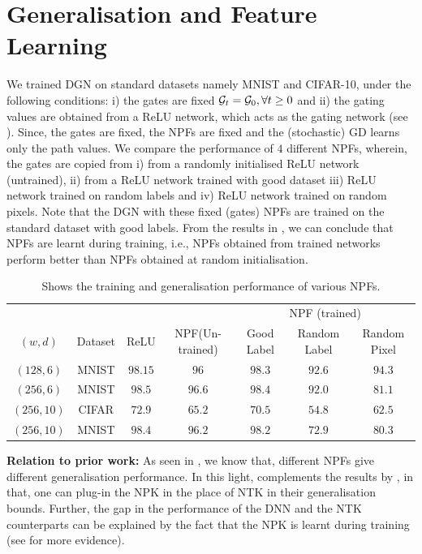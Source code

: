 \section{Generalisation and Feature Learning}\label{sec:generalisation}
We trained DGN on standard datasets namely MNIST and CIFAR-10, under the following conditions: i) the gates are fixed $\mathcal{G}_t=\mathcal{G}_0,\forall t\geq 0$ and ii) the gating values are obtained from a ReLU network, which acts as the gating network (see ). Since, the gates are fixed, the NPFs are fixed and the (stochastic) GD learns only the path values. We compare the performance of $4$ different NPFs, wherein, the gates are copied from i) from a randomly initialised ReLU network (untrained), ii) from a ReLU network trained with good dataset iii) ReLU network trained on random labels and iv) ReLU network trained on random pixels. Note that the DGN with these fixed (gates) NPFs are trained on the standard dataset with good labels. From the results in , we can conclude that NPFs are learnt during training, i.e., NPFs obtained from trained networks perform better than NPFs obtained at random initialisation.\\
\begin{table}[!b]
\begin{tabular}{|c|c|c|c|c|c|c|}\hline
&&&&\multicolumn{3}{c|}{NPF (trained)}\\\cline{5-7}
$(w,d)$	&Dataset		&ReLU		&NPF(Un-trained) 		&Good Label		&Random Label 	&Random Pixel\\\hline
$(128,6)$	& MNIST 		& $98.15$ 		&$96$ 		&$98.3$		&$92.6$			&$94.3$\\\hline
$(256,6)$	& MNIST 		& $98.5$ 		&$96.6$ 		&$98.4$		&$92.0$			&$81.1$\\\hline
$(256,10)$	& CIFAR 		& $72.9$ 		&$65.2$ 		&$70.5$		&$54.8$			&$62.5$\\\hline
$(256,10)$	& MNIST 		& $98.4$ 		&$96.2$ 		&$98.2$		&$72.9$			&$80.3$\\\hline
\end{tabular}
\caption{Shows the training and generalisation performance of various NPFs.}
\label{tb:npfs}
\end{table}
\textbf{Relation to prior work:} As seen in , we know that, different NPFs give different generalisation performance. In this light,  complements the results by \cite{arora2019exact,cao2019generalization}, in that, one can plug-in the NPK in the place of NTK in their generalisation bounds. Further, the gap in the performance of the DNN and the NTK counterparts can be explained by the fact that the NPK is learnt during training (see  for more evidence).\\

